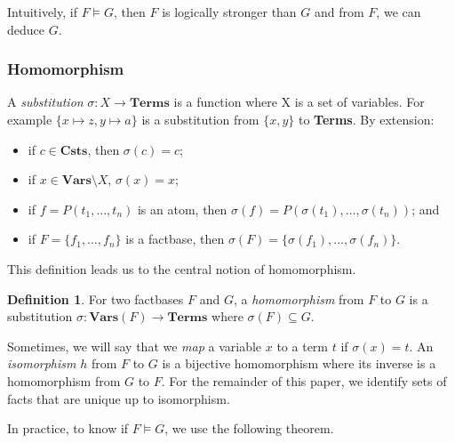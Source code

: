 \documentclass{article}
\theoremstyle{definition}
\newtheorem{definition}{Definition}[section]
\theoremstyle{remark}
\newtheorem{remark}{Remark}[section]
\newcommand{\Vars}{\textbf{Vars}}
\newcommand{\Terms}{\textbf{Terms}}
\newcommand{\Csts}{\textbf{Csts}}
\begin{document}
Intuitively, if $F \models G$, then $F$ is logically stronger than $G$ and from $F$, we can deduce $G$.

\subsubsection{Homomorphism}

A \emph{substitution} $\sigma:X \to \Terms$ is a function where X is a set of variables. For example $\{x \mapsto z, y \mapsto a \}$ is a substitution from $\{x,y\}$ to \Terms. By extension: 
\begin{itemize}
\item if $c \in \Csts$, then $\sigma(c) = c$;
\item if $x \in \Vars \setminus X$, $\sigma(x) = x$;
\item if $f = P(t_1,\ldots,t_n)$ is an atom, then $\sigma(f) = P(\sigma(t_1),\ldots,\sigma(t_n))$; and
\item if $F = \{f_1,\ldots,f_n\}$ is a factbase, then $\sigma(F) = \{\sigma(f_1),\ldots,\sigma(f_n)\}$.
\end{itemize}

This definition leads us to the central notion of homomorphism.

\begin{definition}
For two factbases $F$ and $G$, a \emph{homomorphism} from $F$ to $G$ is a substitution $\sigma:\Vars(F) \to \Terms$ where $\sigma(F) \subseteq G$. 
\end{definition}

Sometimes, we will say that we \emph{map} a variable $x$ to a term $t$ if $\sigma(x)=t$. An \emph{isomorphism} $h$ from $F$ to $G$ is a bijective homomorphism where its inverse is a homomorphism from $G$ to $F$. For the remainder of this paper, we identify sets of facts that are unique up to isomorphism. 

In practice, to know if $F \models G$, we use the following theorem.

\end{document}
